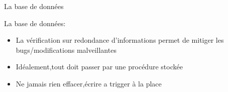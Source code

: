\begin{frame}{La base de données}

 La base de données:
  \begin{itemize}
  \item La vérification sur redondance d'informations permet de mitiger les bugs/modifications malveillantes
  \item Idéalement,tout doit passer par une procédure stockée
  \item Ne jamais rien effacer,écrire a trigger à la place
  \end{itemize}
\end{frame}